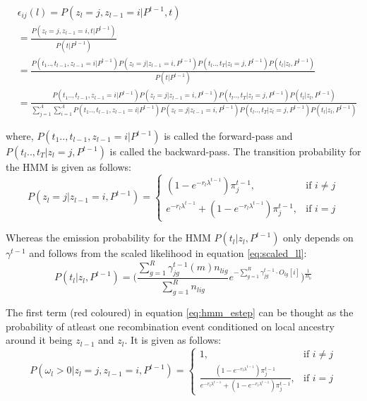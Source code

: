 \begin{footnotesize}
\begin{align}
    &\epsilon_{ij}(l) =P(z_l = j, z_{l-1} = i \vert P^{t-1}, t) \nonumber \\
    &= \frac{P(z_l = j, z_{l-1} = i, t \vert P^{t-1})}{P(t \vert P^{t-1})} \nonumber \\
    &= \frac{P(t_1 .., t_{l-1}, z_{l-1}=i \vert P^{t-1}) P(z_l=j \vert z_{l-1}=i, P^{t-1}) P(t_{l} .., t_T \vert z_l=j, P^{t-1}) P(t_l \vert z_l, P^{t-1})}{P(t \vert P^{t-1})} \nonumber \\
    &= \frac{P(t_1 .., t_{l-1}, z_{l-1}=i \vert P^{t-1}) P(z_l=j \vert z_{l-1}=i, P^{t-1}) P(t_{l} .., t_T \vert z_l=j, P^{t-1}) P(t_l \vert z_l, P^{t-1})}{\sum\limits_{j=1}^{A}\sum\limits_{i=1}^{A} P(t_1 .., t_{l-1}, z_{l-1}=i \vert P^{t-1}) P(z_l=j \vert z_{l-1}=i, P^{t-1}) P(t_{l} .., t_T \vert z_l=j, P^{t-1}) P(t_l \vert z_l, P^{t-1})}
\label{eq:epsilon_ij}
\end{align}
\end{footnotesize}
where, $P(t_1 .., t_{l-1}, z_{l-1}=i \vert P^{t-1})$ is called the forward-pass and $P(t_{l} .., t_T \vert z_l=j, P^{t-1})$ is called the backward-pass. The transition probability for the HMM is given as follows:
\begin{equation}
     P(z_l=j \vert z_{l-1}=i, P^{t-1}) = \begin{cases} (1 - e^{-r_l \lambda^{t-1}})\pi_j^{t-1}, & \text{if } i \neq j \\ e^{-r_l \lambda^{t-1}} + (1 - e^{-r_l \lambda^{t-1}})\pi_j^{t-1} , & \text{if } i = j \end{cases}
\end{equation}

Whereas the emission probability for the HMM $P(t_l \vert z_l, P^{t-1})$ only depends on $\gamma^{t-1}$ and follows from the scaled likelihood in equation \ref{eq:scaled_ll}:
\begin{equation}
   P(t_l \vert z_l, P^{t-1}) =  \Big( \frac{\sum_{g=1}^R\gamma^{t-1}_{jg}(m)n_{lig}}{\sum_{g=1}^R n_{lig}}e^{-\sum_{g=1}^R \gamma^{t-1}_{jg} \cdot O_{lg}[i]} \Big)^{\frac{1}{B_{li}}}
\end{equation}

The first term (red coloured) in equation \ref{eq:hmm_estep} can be thought as the probability of atleast one recombination event conditioned on local ancestry around it being $z_{l-1}$ and $z_l$. It is given as follows:
\begin{equation}
  P(\omega_l > 0 \vert z_l = j, z_{l-1} = i, P^{t-1}) = \begin{cases} 1, & \text{if } i \neq j \\ \frac{(1 - e^{-r_l \lambda^{t-1}})\pi_j^{t-1}}{e^{-r_l \lambda^{t-1}} + (1 - e^{-r_l \lambda^{t-1}})\pi_j^{t-1}} , & \text{if } i = j \end{cases}
\label{eq:e_of_recomb>0}
\end{equation}

